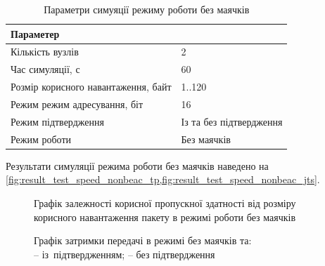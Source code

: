 \documentclass[a4paper,ukrainian,utf8,nocolumnsxix,floatsection,equationsection]{eskdtext}
\begin{document}
\begin{table}[htbp]
\caption{Параметри симуяції режиму роботи без маячків}
\centering
\begin{tabular}{|l|l|}
	\hline
	Параметер                           &                         \\ \hline
	Кількість вузлів                    & 2                       \\ \hline
	Час симуляції, с                    & 60                      \\ \hline
	Розмір корисного навантаження, байт & 1..120                  \\ \hline
	Режим режим адресування, біт        & 16                      \\ \hline
	Режим підтвердження                 & Із та без підтвердження \\ \hline
	Режим роботи                        & Без маячків             \\ \hline
\end{tabular}
\label{tbl:simulation_settings_nonbeackon}
\end{table}

Результати симуляції режима роботи без маячків наведено на \cref{fig:result_test_speed_nonbeac_tp,fig:result_test_speed_nonbeac_jts}.

\begin{figure}[bth]
	\centering
	\caption{\label{fig:result_test_speed_nonbeac_tp}Графік залежності корисної пропускної здатності від розміру корисного навантаження пакету в режимі роботи без маячків}
\end{figure}

\begin{figure}[bth]
	\centering
	\caption{Графік затримки передачі в режимі без маячків та: \\
		\protect{} -- із~підтвердженням; 
		\protect{} -- без підтвердження
		}\label{fig:result_test_speed_nonbeac_jts}
\end{figure}
\end{document}
